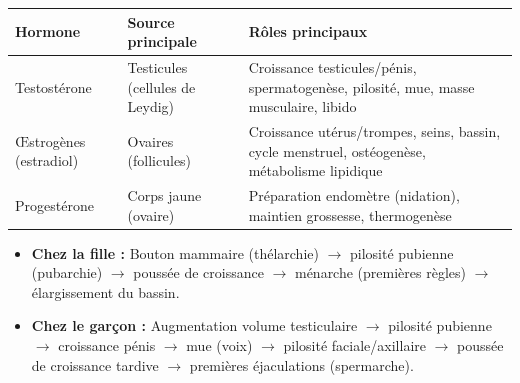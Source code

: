 \documentclass[11pt]{article}
\begin{document}
\begin{propriete}
\begin{center}
\begin{tabularx}{\linewidth}{|l|X|X|}\hline
\textbf{Hormone} & \textbf{Source principale} & \textbf{Rôles principaux} \\ \hline
Testostérone & Testicules (cellules de Leydig) & Croissance testicules/pénis, spermatogenèse, pilosité, mue, masse musculaire, libido \\ \hline
Œstrogènes (estradiol) & Ovaires (follicules) & Croissance utérus/trompes, seins, bassin, cycle menstruel, ostéogenèse, métabolisme lipidique \\ \hline
Progestérone & Corps jaune (ovaire) & Préparation endomètre (nidation), maintien grossesse, thermogenèse \\ \hline
\end{tabularx}
\end{center}
\end{propriete}

\begin{exemplebox}
\begin{itemize}
    \item \textbf{Chez la fille :} Bouton mammaire (thélarchie) $\rightarrow$ pilosité pubienne (pubarchie) $\rightarrow$ poussée de croissance $\rightarrow$ ménarche (premières règles) $\rightarrow$ élargissement du bassin.
    \item \textbf{Chez le garçon :} Augmentation volume testiculaire $\rightarrow$ pilosité pubienne $\rightarrow$ croissance pénis $\rightarrow$ mue (voix) $\rightarrow$ pilosité faciale/axillaire $\rightarrow$ poussée de croissance tardive $\rightarrow$ premières éjaculations (spermarche).
\end{itemize}
\end{exemplebox}
\end{document}
